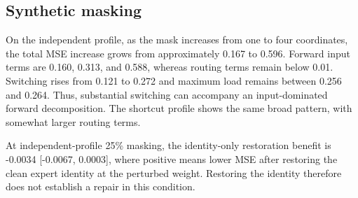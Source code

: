 \documentclass[10pt,letterpaper]{article}
\begin{document}
\subsection{Synthetic masking}

On the independent profile, as the mask increases from one to four coordinates, the total MSE increase grows from approximately 0.167 to 0.596. Forward input terms are 0.160, 0.313, and 0.588, whereas routing terms remain below 0.01. Switching rises from 0.121 to 0.272 and maximum load remains between 0.256 and 0.264. Thus, substantial switching can accompany an input-dominated forward decomposition. The shortcut profile shows the same broad pattern, with somewhat larger routing terms.


\begin{table}[!htbp]
\centering
\caption{Shortcut-profile information-loss effects. Input, Routing, and Total are changes in raw MSE; Switch is an expert-ID switch rate. Mask indicators remain zero.}
\label{tab:results4}
\small
\setlength{\tabcolsep}{4pt}
\renewcommand{\arraystretch}{1.1}
\ifdim\wd\reporttablebox>\linewidth
\resizebox{\linewidth}{!}{\usebox{\reporttablebox}}
\else\usebox{\reporttablebox}\fi
\end{table}


At independent-profile 25\% masking, the identity-only restoration benefit is -0.0034 [-0.0067, 0.0003], where positive means lower MSE after restoring the clean expert identity at the perturbed weight. Restoring the identity therefore does not establish a repair in this condition.
\end{document}
